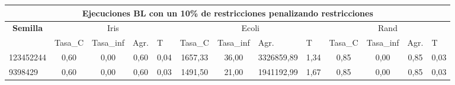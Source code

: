 \documentclass[12pt, spanish]{article}
\begin{document}
\begin{table}[H]
\small

\begin{adjustwidth}{-1.2cm}{-1.2cm}%

\begin{tabular}{|l|c|c|c|c|c|c|c|c|c|c|c|c|}
\hline
\multicolumn{13}{|c|}{\textbf{Ejecuciones BL con un 10\% de restricciones penalizando restricciones}}                                                                                                                                                                                                                                                                                                                  \\ \hline
\multicolumn{1}{|c|}{\multirow{2}{*}{\textbf{Semilla}}} & \multicolumn{4}{c|}{Iris}                                                                                          & \multicolumn{4}{c|}{Ecoli}                                                                                         & \multicolumn{4}{c|}{Rand}                                                                                          \\ \cline{2-13} 
\multicolumn{1}{|c|}{}                                  & \multicolumn{1}{l|}{Tasa\_C} & \multicolumn{1}{l|}{Tasa\_inf} & \multicolumn{1}{l|}{Agr.} & \multicolumn{1}{l|}{T} & \multicolumn{1}{l|}{Tasa\_C} & \multicolumn{1}{l|}{Tasa\_inf} & \multicolumn{1}{l|}{Agr.} & \multicolumn{1}{l|}{T} & \multicolumn{1}{l|}{Tasa\_C} & \multicolumn{1}{l|}{Tasa\_inf} & \multicolumn{1}{l|}{Agr.} & \multicolumn{1}{l|}{T} \\ \hline
123452244                                               & 0,60                         & 0,00                           & 0,60                      & 0,04                   & 1657,33                      & 36,00                          & 3326859,89                & 1,34                   & 0,85                         & 0,00                           & 0,85                      & 0,03                   \\ \hline
9398429                                                 & 0,60                         & 0,00                           & 0,60                      & 0,03                   & 1491,50                      & 21,00                          & 1941192,99                & 1,67                   & 0,85                         & 0,00                           & 0,85                      & 0,03                   \\ \hline

\end{tabular}
\end{adjustwidth}
\end{table}
\end{document}
